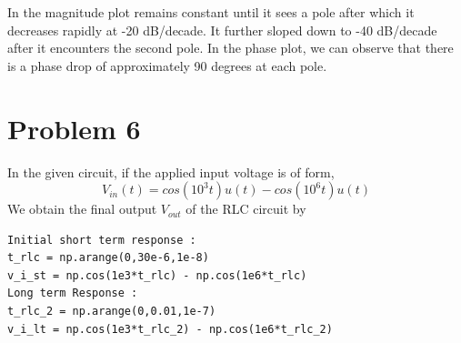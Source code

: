 \documentclass[12pt, a4paper]{report}
\begin{document}
 In the magnitude plot remains constant until it sees a pole after which it decreases rapidly at -20 dB/decade. It further sloped down to -40 dB/decade after it encounters the second pole. 
 In the phase plot, we can observe that there is a phase drop of approximately 90 degrees at each pole.


\section*{Problem 6}
In the given circuit, if the applied input voltage is of form, 
\begin{equation*}
V_{in}(t) = cos(10^3t)u(t) - cos(10^6t)u(t)
\end{equation*}
We obtain the final output $V_{out}$ of the RLC circuit by

\begin{verbatim}
Initial short term response :
t_rlc = np.arange(0,30e-6,1e-8)
v_i_st = np.cos(1e3*t_rlc) - np.cos(1e6*t_rlc)
Long term Response :
t_rlc_2 = np.arange(0,0.01,1e-7)
v_i_lt = np.cos(1e3*t_rlc_2) - np.cos(1e6*t_rlc_2)
\end{verbatim}
\end{document}
